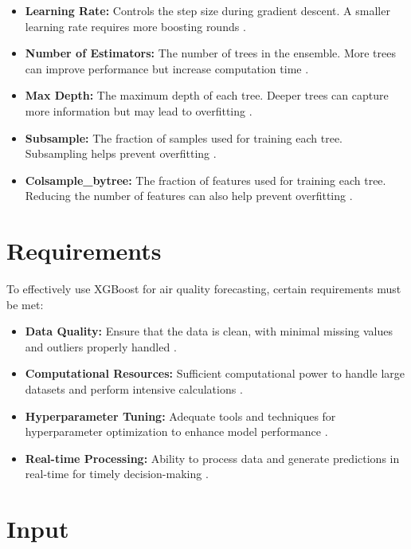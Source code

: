 \begin{itemize}
	\item \textbf{Learning Rate:} Controls the step size during gradient descent. A smaller learning rate requires more boosting rounds \cite{Goodfellow:2016}.
	\item \textbf{Number of Estimators:} The number of trees in the ensemble. More trees can improve performance but increase computation time \cite{Chen:2016}.
	\item \textbf{Max Depth:} The maximum depth of each tree. Deeper trees can capture more information but may lead to overfitting \cite{Goodfellow:2016}.
	\item \textbf{Subsample:} The fraction of samples used for training each tree. Subsampling helps prevent overfitting \cite{Chen:2016}.
	\item \textbf{Colsample\_bytree:} The fraction of features used for training each tree. Reducing the number of features can also help prevent overfitting \cite{Aggarwal:2015}.
\end{itemize}

\section{Requirements}

To effectively use XGBoost for air quality forecasting, certain requirements must be met:

\begin{itemize}
	\item \textbf{Data Quality:} Ensure that the data is clean, with minimal missing values and outliers properly handled \cite{Chen:2016}.
	\item \textbf{Computational Resources:} Sufficient computational power to handle large datasets and perform intensive calculations \cite{Goodfellow:2016}.
	\item \textbf{Hyperparameter Tuning:} Adequate tools and techniques for hyperparameter optimization to enhance model performance \cite{Chen:2016}.
	\item \textbf{Real-time Processing:} Ability to process data and generate predictions in real-time for timely decision-making \cite{Aggarwal:2015}.
\end{itemize}

\section{Input}

